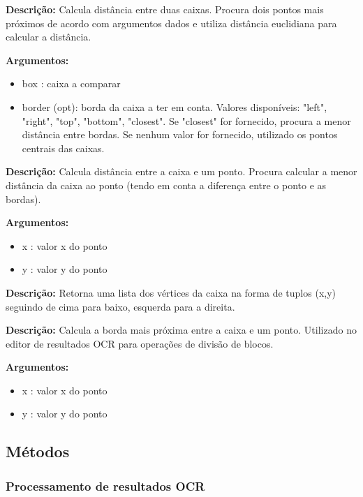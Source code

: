 
\textbf{Descrição:} Calcula distância entre duas caixas. Procura dois pontos mais próximos de acordo com argumentos dados e utiliza distância euclidiana para calcular a distância.

\textbf{Argumentos:}
\begin{itemize}\setlength\itemsep{-0.3em}
	\item box : caixa a comparar
	\item border (opt): borda da caixa a ter em conta. Valores disponíveis: "left", "right", "top", "bottom", "closest". Se "closest" for fornecido, procura a menor distância entre bordas. Se nenhum valor for fornecido, utilizado os pontos centrais das caixas.
\end{itemize}



\textbf{Descrição:} Calcula distância entre a caixa e um ponto. Procura calcular a menor distância da caixa ao ponto (tendo em conta a diferença entre o ponto e as bordas).

\textbf{Argumentos:}
\begin{itemize}\setlength\itemsep{-0.3em}
	\item x : valor x do ponto
	\item y : valor y do ponto
\end{itemize}


\textbf{Descrição:} Retorna uma lista dos vértices da caixa na forma de tuplos (x,y) seguindo de cima para baixo, esquerda para a direita.



\textbf{Descrição:} Calcula a borda mais próxima entre a caixa e um ponto. Utilizado no editor de resultados OCR para operações de divisão de blocos.

\textbf{Argumentos:}
\begin{itemize}\setlength\itemsep{-0.3em}
	\item x : valor x do ponto
	\item y : valor y do ponto
\end{itemize}


\subsection{Métodos}
\label{contribution_methods}


\subsubsection{Processamento de resultados OCR}
\label{contribution_ocr_posprocessing}


